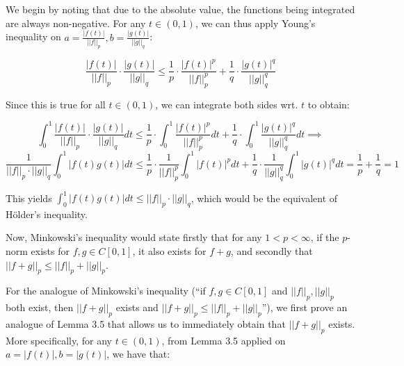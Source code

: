 \begin{solution}
    
    We begin by noting that due to the absolute value, the functions being integrated are always non-negative.
    For any $t \in (0, 1)$, we can thus apply Young's inequality on $a = \frac{\lvert f(t) \rvert}{\lvert \lvert f \rvert \rvert_p}, b = \frac{\lvert g(t) \rvert}{\lvert \lvert g \rvert \rvert_q}$:

    $$\frac{\lvert f(t) \rvert}{\lvert \lvert f \rvert \rvert_p}\cdot \frac{\lvert g(t) \rvert}{\lvert \lvert g \rvert \rvert_q} \leq \frac{1}{p}\cdot \frac{\lvert f(t) \rvert^p}{\lvert \lvert f \rvert \rvert_p^p} + \frac{1}{q} \cdot \frac{\lvert g(t) \rvert^q}{\lvert \lvert g \rvert \rvert_q^{q}}$$

    Since this is true for all $t \in (0, 1)$, we can integrate both sides wrt. $t$ to obtain:
    
    $$\int_{0}^{1}\frac{\lvert f(t) \rvert}{\lvert \lvert f \rvert \rvert_p}\cdot \frac{\lvert g(t) \rvert}{\lvert \lvert g \rvert \rvert_q} dt \leq \frac{1}{p}\cdot \int_{0}^{1} \frac{\lvert f(t) \rvert^p}{\lvert \lvert f \rvert \rvert_p^p} dt + \frac{1}{q} \cdot \int_{0}^{1} \frac{\lvert g(t) \rvert^q}{\lvert \lvert g \rvert \rvert_q^{q}} dt \implies$$
    $$\frac{1}{\lvert \lvert f \rvert \rvert_p \cdot \lvert \lvert g \rvert \rvert_q} \int_{0}^{1} \lvert f(t) g(t) \rvert dt \leq \frac{1}{p}\cdot \frac{1}{\lvert \lvert f \rvert \rvert_p^p}\int_{0}^{1} \lvert f(t) \rvert^p dt + \frac{1}{q} \cdot \frac{1}{\lvert \lvert g \rvert \rvert_q^{q}} \int_{0}^{1} \lvert g(t) \rvert^q dt = \frac{1}{p} + \frac{1}{q} = 1$$

    This yields $\int_{0}^{1} \lvert f(t) g(t) \rvert dt \leq \lvert \lvert f \rvert \rvert_p \cdot \lvert \lvert g \rvert \rvert_q$, which would be the equivalent of Hölder's inequality.

    Now, Minkowski's inequality would state firstly that for any $1 < p < \infty$, if the $p$-norm exists for $f, g \in C[0, 1]$, it also exists for $f + g$, and secondly that $\lvert \lvert f + g \rvert \rvert_p \leq \lvert \lvert f \rvert \rvert_p + \lvert \lvert g \rvert \rvert_p$.

    For the analogue of Minkowski's inequality (``if $f, g \in C[0, 1]$ and $\lvert \lvert f \rvert \rvert_p, \lvert \lvert g \rvert \rvert_p$ both exist, then $\lvert \lvert f + g \rvert \rvert_p$ exists and $\lvert \lvert f + g \rvert \rvert_p \leq \lvert \lvert f \rvert \rvert_p + \lvert \lvert g \rvert \rvert_p$''), we first prove an analogue of Lemma 3.5 that allows us to immediately obtain that $\lvert \lvert f + g \rvert \rvert_p$ exists.
    More specifically, for any $t \in (0, 1)$, from Lemma 3.5 applied on $a = \lvert f(t) \rvert, b = \lvert g(t) \rvert$, we have that:


\end{solution}
